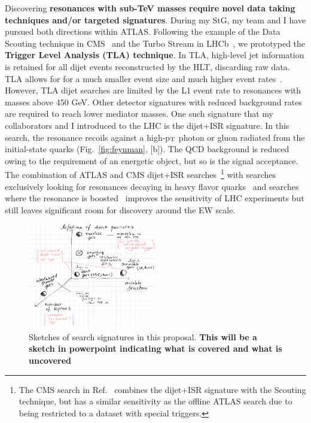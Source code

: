 Discovering \textbf{resonances with sub-TeV masses require novel data taking techniques and/or targeted signatures}. 
During my StG, my team and I have pursued both directions within ATLAS. 
Following the example of the Data Scouting technique in CMS~\cite{ToBeCited} and the Turbo Stream in LHCb~\cite{ToBeCited}, we prototyped the \textbf{Trigger Level Analysis (TLA) technique}. 
In TLA, high-level jet information is retained for all dijet events reconstructed by the HLT, discarding raw data. 
TLA allows for for a much smaller event size and much higher event rates~\cite{ToBeCited}.%
However, TLA dijet searches are limited by the L1 event rate to resonances with masses above 450 GeV. 
Other detector signatures with reduced background rates are required to reach lower mediator masses. 
One such signature that my collaborators and I introduced to the LHC is the dijet+ISR signature. 
In this search, the resonance recoils against a high-p$_{\rm{T}}$ photon or gluon radiated from the initial-state quarks (Fig.~\ref{fig:feynman}, [b]). 
The QCD background is reduced owing to the requirement of an energetic object, but so is the signal acceptance. 
The combination of ATLAS and CMS dijet+ISR searches~\cite{ToBeCited}\footnote{The CMS search in Ref.~\cite{ToBeCited} %
combines the dijet+ISR signature with the Scouting technique, but has a similar sensitivity as the offline ATLAS search due to being restricted to a dataset with special triggers.}
with searches exclusively looking for resonances decaying in heavy flavor quarks~\cite{ToBeCited} %
and searches where the resonance is boosted~\cite{ToBeCited} %
improves the sensitivity of LHC experiments but still leaves significant room for discovery around the EW scale. 

\begin{figure} 
\begin{center}
\includegraphics[width=0.5\textwidth]{figs_B2/darksectorsketch.png}
\caption{Sketches of search signatures in this proposal. \color{red}\textbf{This will be a sketch in powerpoint indicating what is covered and what is uncovered}\color{black}\label{fig:darksectorssketch} }
\vskip2pt
\end{center}
\end{figure}
\vskip5pt

